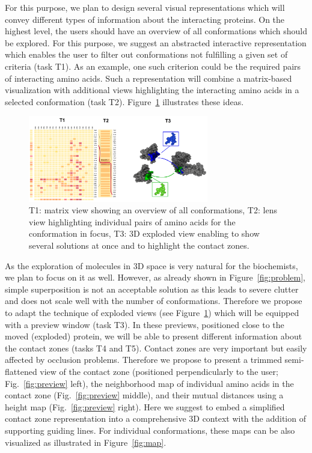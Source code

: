 \documentclass[11pt,a4paper,titlepage,oneside,onecolumn]{article}
\begin{document}
For this purpose, we plan to design several visual representations which will convey different types of information about the interacting proteins.
On the highest level, the users should have an overview of all conformations which should be explored. 
For this purpose, we suggest an abstracted interactive representation which enables the user to filter out conformations not fulfilling a given set of criteria (task T1).
As an example, one such criterion could be the required pairs of interacting amino acids. 
Such a representation will combine a matrix-based visualization with additional views highlighting the interacting amino acids in a selected conformation (task T2).
Figure~\ref{fig:matrix} illustrates these ideas. 

\begin{figure}[ht]
\centering
\includegraphics[width=0.7\textwidth]{pics/matrix.png}
\caption{T1: matrix view showing an overview of all conformations, T2: lens view highlighting individual pairs of amino acids for the conformation in focus, T3: 3D exploded view enabling to show several solutions at once and to highlight the contact zones.}
\label{fig:matrix}
\end{figure}

As the exploration of molecules in 3D space is very natural for the biochemists, we plan to focus on it as well.
However, as already shown in Figure~\ref{fig:problem}, simple superposition is not an acceptable solution as this leads to severe clutter and does not scale well with the number of conformations.
Therefore we propose to adapt the technique of exploded views (see Figure~\ref{fig:matrix}) which will be equipped with a preview window (task T3).
In these previews, positioned close to the moved (exploded) protein, we will be able to present different information about the contact zones (tasks T4 and T5).
Contact zones are very important but easily affected by occlusion problems. 
Therefore we propose to present a trimmed semi-flattened view of the contact zone (positioned perpendicularly to the user; Fig.~\ref{fig:preview} left), the neighborhood map of individual amino acids in the contact zone (Fig.~\ref{fig:preview} middle), and their mutual distances using a height map (Fig.~\ref{fig:preview} right).
Here we suggest to embed a simplified contact zone representation into a comprehensive 3D context with the addition of supporting guiding lines.
For individual conformations, these maps can be also visualized as illustrated in Figure~\ref{fig:map}.
\end{document}
